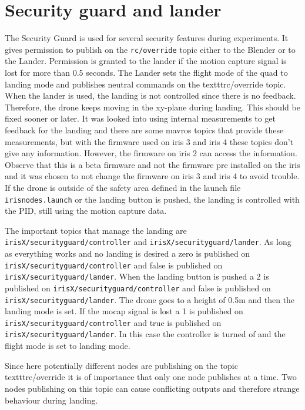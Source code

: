 \documentclass[titlepage,11pt,a4paper]{article}
\begin{document}
\section{Security guard and lander}
\label{sec:security_guard}

The Security Guard is used for several security features during
experiments. It gives permission to publish on the
\texttt{rc/override} topic either to the Blender or to the Lander. Permission is granted to the lander if the motion capture signal is lost for more than 0.5 seconds. The Lander sets the flight mode of the quad to landing mode and publishes neutral commands on the texttt{rc/override} topic. When the lander is used, the landing is not controlled since there is no feedback. Therefore, the drone keeps moving in the xy-plane during landing. This should be fixed sooner or later. It was looked into using internal measurements to get feedback for the landing and there are some mavros topics that provide these measurements, but with the firmware used on iris 3 and iris 4 these topics don't give any information. However, the firmware on iris 2 can access the information. Observe that this is a beta firmware and not the firmware pre installed on the iris and it was chosen to not change the firmware on iris 3 and iris 4 to avoid trouble. If the drone is outside of the safety area defined in the launch file \texttt{iris\textunderscore nodes.launch} or the landing button is pushed, the landing is controlled with the PID, still using the motion capture data.

The important topics that manage the landing are \texttt{irisX/security\textunderscore guard/controller} and \texttt{irisX/security\textunderscore guard/lander}. As long as everything works and no landing is desired a zero is published on \texttt{irisX/security\textunderscore guard/controller} and false is published on \texttt{irisX/security\textunderscore guard/lander}. When the landing button is pushed a 2 is published on \texttt{irisX/security\textunderscore guard/controller} and false is published on \texttt{irisX/security\textunderscore guard/lander}. The drone goes to a height of 0.5m and then the landing mode is set. If the mocap signal is lost a 1 is published on \texttt{irisX/security\textunderscore guard/controller} and true is published on \texttt{irisX/security\textunderscore guard/lander}. In this case the controller is turned of and the flight mode is set to landing mode. 

Since here potentially different nodes are publishing on the topic texttt{rc/override} it is of importance that only one node publishes at a time. Two nodes publishing on this topic can cause conflicting outputs and therefore strange behaviour during landing.
\end{document}
